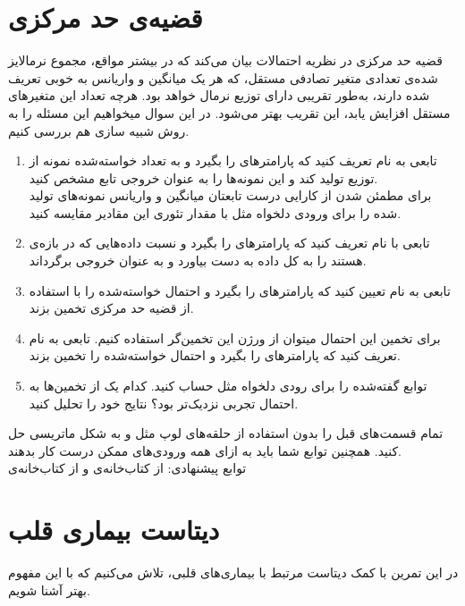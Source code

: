 \documentclass[a4paper]{article}
\begin{document}
\section{قضیه‌ی حد مرکزی}
قضیه حد مرکزی در نظریه احتمالات بیان می‌کند که در بیشتر مواقع، مجموع نرمالایز شده‌ی تعدادی متغیر تصادفی مستقل، که هر یک میانگین و واریانس به خوبی تعریف شده دارند، به‌طور تقریبی دارای توزیع نرمال خواهد بود. هرچه تعداد این متغیرهای مستقل افزایش یابد، این تقریب بهتر می‌شود. در این سوال میخواهیم این مسئله را به روش شبیه سازی هم بررسی کنیم. 
\begin{enumerate}
	\item 
	تابعی به نام 
	تعریف کنید که پارامتر‌های
	را بگیرد و به تعداد خواسته‌شده
	نمونه از توزیع 
	تولید کند و این نمونه‌ها را به عنوان خروجی تابع مشخص کنید. 
	\\
	برای مطمئن شدن از کارایی درست تابعتان میانگین و واریانس نمونه‌های تولید شده را برای ورودی دلخواه مثل 
	با مقدار تئوری این مقادیر مقایسه کنید.
	\item 
	تابعی با نام 
	تعریف کنید که پارامترهای 
	را بگیرد و نسبت داده‌هایی که در بازه‌ی 
	\lr{[l, u]}
	هستند را به کل داده‌ به دست بیاورد و به عنوان خروجی برگرداند. 
	\item
	 تابعی به نام 
	تعیین کنید که  پارامتر‌های
	را بگیرد و احتمال خواسته‌شده را با استفاده از قضیه حد مرکزی تخمین بزند. 
	\item
	برای تخمین این احتمال میتوان از ورژن 
	این تخمین‌گر استفاده کنیم. تابعی به نام 
	تعریف کنید که پارامتر‌های
	را بگیرد و احتمال خواسته‌شده را تخمین بزند. 
	\item
	توابع گفته‌شده را برای رودی دلخواه مثل 
	حساب کنید. کدام یک از تخمین‌ها به احتمال تجربی نزدیک‌تر بود؟ نتایج خود را تحلیل کنید.
\end{enumerate}
تمام قسمت‌های قبل را بدون استفاده‌ از حلقه‌های لوپ مثل 
و به شکل ماتریسی حل کنید. همچنین توابع شما باید به ازای همه‌ ورودی‌های ممکن درست کار بدهند. 
\\
توابع پیشنهادی:
از کتاب‌خانه‌ی 
و 
از کتاب‌خانه‌ی 
\section{دیتاست بیماری قلب}
در این تمرین با کمک دیتاست مرتبط با بیماری‌های قلبی، تلاش می‌کنیم که با این مفهوم بهتر آشنا شویم.
\end{document}
